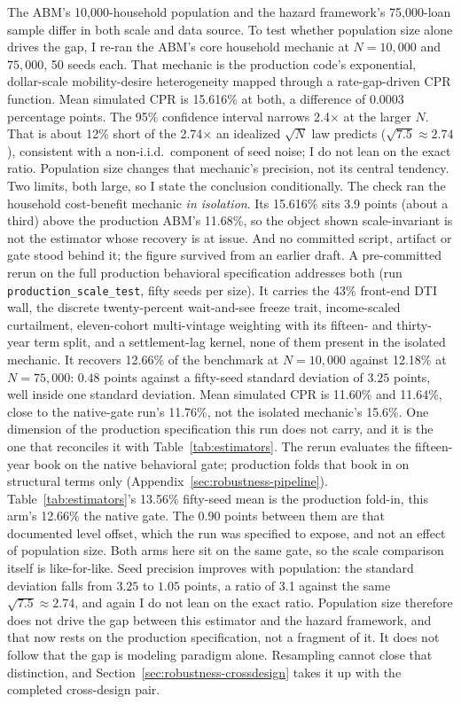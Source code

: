 \documentclass[12pt]{article}
\begin{document}
The ABM's 10,000-household population and the hazard framework's 75,000-loan sample differ in both scale and data source. To test whether population size alone drives the gap, I re-ran the ABM's core household mechanic at $N = 10{,}000$ and $75{,}000$, 50 seeds each. That mechanic is the production code's exponential, dollar-scale mobility-desire heterogeneity mapped through a rate-gap-driven CPR function. Mean simulated CPR is 15.616\% at both, a difference of 0.0003 percentage points. The 95\% confidence interval narrows 2.4$\times$ at the larger $N$. That is about 12\% short of the 2.74$\times$ an idealized $\sqrt{N}$ law predicts ($\sqrt{7.5} \approx 2.74$), consistent with a non-i.i.d.\ component of seed noise; I do not lean on the exact ratio. Population size changes that mechanic's precision, not its central tendency. Two limits, both large, so I state the conclusion conditionally. The check ran the household cost-benefit mechanic \emph{in isolation}. Its 15.616\% sits 3.9 points (about a third) above the production ABM's 11.68\%, so the object shown scale-invariant is not the estimator whose recovery is at issue. And no committed script, artifact or gate stood behind it; the figure survived from an earlier draft. A pre-committed rerun on the full production behavioral specification addresses both (run \texttt{production\_scale\_test}, fifty seeds per size). It carries the 43\% front-end DTI wall, the discrete twenty-percent wait-and-see freeze trait, income-scaled curtailment, eleven-cohort multi-vintage weighting with its fifteen- and thirty-year term split, and a settlement-lag kernel, none of them present in the isolated mechanic. It recovers 12.66\% of the benchmark at $N = 10{,}000$ against 12.18\% at $N = 75{,}000$: $0.48$ points against a fifty-seed standard deviation of $3.25$ points, well inside one standard deviation. Mean simulated CPR is 11.60\% and 11.64\%, close to the native-gate run's 11.76\%, not the isolated mechanic's 15.6\%. One dimension of the production specification this run does not carry, and it is the one that reconciles it with Table~\ref{tab:estimators}. The rerun evaluates the fifteen-year book on the native behavioral gate; production folds that book in on structural terms only (Appendix~\ref{sec:robustness-pipeline}). Table~\ref{tab:estimators}'s 13.56\% fifty-seed mean is the production fold-in, this arm's 12.66\% the native gate. The 0.90 points between them are that documented level offset, which the run was specified to expose, and not an effect of population size. Both arms here sit on the same gate, so the scale comparison itself is like-for-like. Seed precision improves with population: the standard deviation falls from $3.25$ to $1.05$ points, a ratio of 3.1 against the same $\sqrt{7.5} \approx 2.74$, and again I do not lean on the exact ratio. Population size therefore does not drive the gap between this estimator and the hazard framework, and that now rests on the production specification, not a fragment of it. It does not follow that the gap is modeling paradigm alone. Resampling cannot close that distinction, and Section~\ref{sec:robustness-crossdesign} takes it up with the completed cross-design pair.
\end{document}

